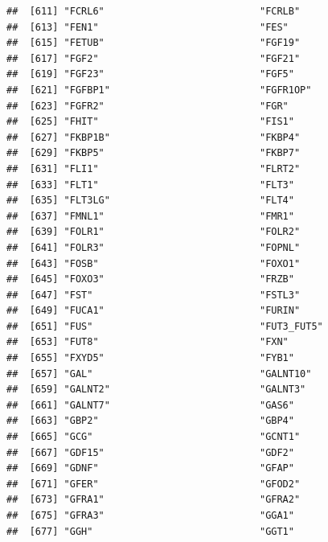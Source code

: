 \documentclass[
]{article}
\begin{document}
\begin{verbatim}
##  [611] "FCRL6"                           "FCRLB"                          
##  [613] "FEN1"                            "FES"                            
##  [615] "FETUB"                           "FGF19"                          
##  [617] "FGF2"                            "FGF21"                          
##  [619] "FGF23"                           "FGF5"                           
##  [621] "FGFBP1"                          "FGFR1OP"                        
##  [623] "FGFR2"                           "FGR"                            
##  [625] "FHIT"                            "FIS1"                           
##  [627] "FKBP1B"                          "FKBP4"                          
##  [629] "FKBP5"                           "FKBP7"                          
##  [631] "FLI1"                            "FLRT2"                          
##  [633] "FLT1"                            "FLT3"                           
##  [635] "FLT3LG"                          "FLT4"                           
##  [637] "FMNL1"                           "FMR1"                           
##  [639] "FOLR1"                           "FOLR2"                          
##  [641] "FOLR3"                           "FOPNL"                          
##  [643] "FOSB"                            "FOXO1"                          
##  [645] "FOXO3"                           "FRZB"                           
##  [647] "FST"                             "FSTL3"                          
##  [649] "FUCA1"                           "FURIN"                          
##  [651] "FUS"                             "FUT3_FUT5"                      
##  [653] "FUT8"                            "FXN"                            
##  [655] "FXYD5"                           "FYB1"                           
##  [657] "GAL"                             "GALNT10"                        
##  [659] "GALNT2"                          "GALNT3"                         
##  [661] "GALNT7"                          "GAS6"                           
##  [663] "GBP2"                            "GBP4"                           
##  [665] "GCG"                             "GCNT1"                          
##  [667] "GDF15"                           "GDF2"                           
##  [669] "GDNF"                            "GFAP"                           
##  [671] "GFER"                            "GFOD2"                          
##  [673] "GFRA1"                           "GFRA2"                          
##  [675] "GFRA3"                           "GGA1"                           
##  [677] "GGH"                             "GGT1"                           

\end{verbatim}
\end{document}

